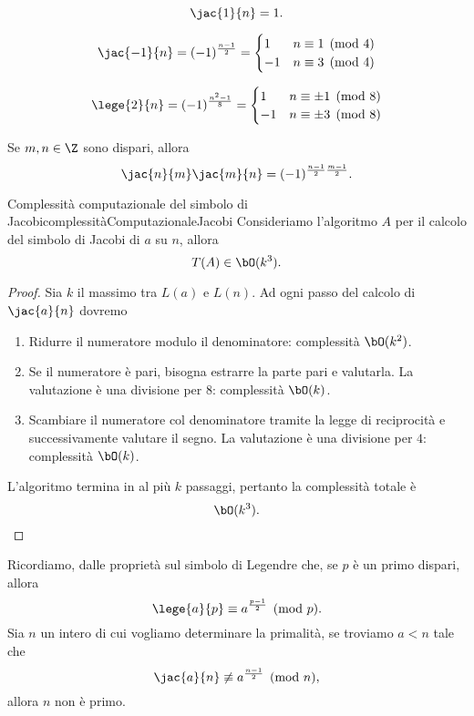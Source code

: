 	\begin{pr}
		\[
		\jac{1}{n} = 1.
		\]
	\end{pr}

	\begin{pr}
		\[
		\jac{-1}{n} = (-1)^{\frac{n-1}{2}} = 	\begin{cases}
												1 & n\equiv 1 \pmod{4}\\
												-1 & n\equiv 3 \pmod{4}
												\end{cases}
		\]
	\end{pr}

	\begin{pr}
		\[
		\lege{2}{n} = (-1)^{\frac{n^2-1}{8}} = 	\begin{cases}
												1 & n\equiv \pm 1 \pmod{8}\\
												-1 & n\equiv \pm 3 \pmod{8}
												\end{cases}
		\]	
	\end{pr}

	\begin{pr}
	Se \(m,n\in\Z\) sono dispari, allora
		\[
		\jac{n}{m}\jac{m}{n} = (-1)^{\frac{n-1}{2}\frac{m-1}{2}}.
		\]
	\end{pr}

	\begin{prop}{Complessità computazionale del simbolo di Jacobi}{complessitàComputazionaleJacobi}
	Consideriamo l'algoritmo \(A\) per il calcolo del simbolo di Jacobi di \(a\) su \(n\), allora
		\[
		T(A) \in \bO(k^3).
		\]
	\end{prop}

	\begin{proof}
	Sia \(k\) il massimo tra \(L(a)\) e \(L(n)\). Ad ogni passo del calcolo di \(\jac{a}{n}\) dovremo
	\begin{enumerate}
		\item Ridurre il numeratore modulo il denominatore: complessità \(\bO(k^2)\).
		\item Se il numeratore è pari, bisogna estrarre la parte pari e valutarla.
		La valutazione è una divisione per \(8\): complessità \(\bO(k)\).
		\item Scambiare il numeratore col denominatore tramite la legge di reciprocità e successivamente valutare il segno.
		La valutazione è una divisione per \(4\): complessità \(\bO(k)\).
	\end{enumerate}
	L'algoritmo termina in al più \(k\) passaggi, pertanto la complessità totale è
		\[
		\bO(k^3).\qedhere
		\]
	\end{proof}
%
%
	Ricordiamo, dalle proprietà sul simbolo di Legendre che, se \(p\) è un primo dispari, allora
		\[
		\lege{a}{p} \equiv a^{\frac{p-1}{2}} \pmod{p}.
		\]
	Sia \(n\) un intero di cui vogliamo determinare la primalità, se troviamo \(a<n\) tale che
		\[
		\jac{a}{n} \not\equiv a^{\frac{n-1}{2}} \pmod{n},
		\]
	allora \(n\) non è primo.

